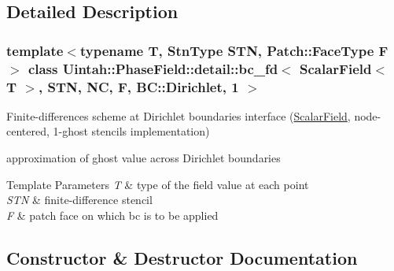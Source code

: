 \subsection{Detailed Description}
\subsubsection*{template$<$typename T, Stn\+Type S\+TN, Patch\+::\+Face\+Type F$>$\newline
class Uintah\+::\+Phase\+Field\+::detail\+::bc\+\_\+fd$<$ Scalar\+Field$<$ T $>$, S\+T\+N, N\+C, F, B\+C\+::\+Dirichlet, 1 $>$}

Finite-\/differences scheme at Dirichlet boundaries interface (\hyperlink{structUintah_1_1PhaseField_1_1ScalarField}{Scalar\+Field}, node-\/centered, 1-\/ghost stencils implementation) 

approximation of ghost value across Dirichlet boundaries


\begin{DoxyTemplParams}{Template Parameters}
{\em T} & type of the field value at each point \\
\hline
{\em S\+TN} & finite-\/difference stencil \\
\hline
{\em F} & patch face on which bc is to be applied \\
\hline
\end{DoxyTemplParams}


\subsection{Constructor \& Destructor Documentation}
\mbox{\label{classUintah_1_1PhaseField_1_1detail_1_1bc__fd_3_01ScalarField_3_01T_01_4_00_01STN_00_01NC_00_01Fc8a6e28ffa258d282d0a921216b0ed9f_a847bfeaf6f5d7dd5e32c1f9ff5df4a60}} 
